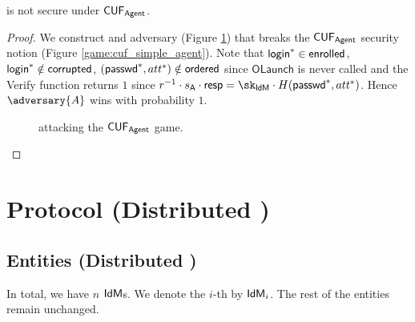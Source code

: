 \begin{theorem}
    \construction is not secure under $\mathsf{CUF}_{\textsf{Agent}}$. 
\end{theorem}

\begin{proof}
    We construct and adversary  (Figure \ref{game:cuf_agent_attack}) that breaks the $\mathsf{CUF}_{\textsf{Agent}}$ security notion (Figure \ref{game:cuf_simple_agent}). Note that $\mathsf{login}^* \in \mathsf{enrolled}$, $\mathsf{login}^* \notin \mathsf{corrupted}$, $(\textsf{passwd}^*, att^*) \notin \mathsf{ordered}$ since $\mathsf{OLaunch}$ is never called and the Verify function returns $1$ since $r^{-1}\cdot \agentsecret\cdot \response = \sk_\idm\cdot H(\pseudo^*, att^*)$. Hence $\adversary{A}$ wins with probability $1$. 

    \begin{figure*}
\begin{pchstack}[center, space=0.2cm, boxed]
    \begin{pcvstack}
    \end{pcvstack}
    \end{pchstack}
\caption{ attacking the $\mathsf{CUF}_{\textsf{Agent}}$ game.}
\label{game:cuf_agent_attack}
\end{figure*}
\end{proof}



\section{Protocol (Distributed \idm)}
\subsection{Entities  (Distributed \idm)}
In total, we have $n$ $\textsf{IdM}$s. We denote the $i$-th by $\textsf{IdM}_i$. The rest of the entities remain unchanged.

